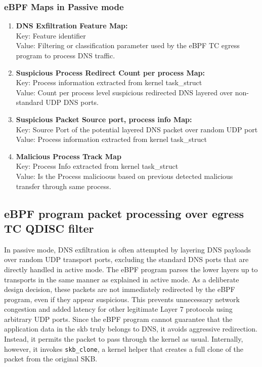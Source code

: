 \documentclass [11pt, proquest] {uwthesis}[2020/02/24]
\begin{document}
\subsubsection{\textbf{eBPF Maps in Passive mode}}
\begin{enumerate}[itemsep=1pt,parsep=0pt]
\label{passive:maps}
\item \textbf{DNS Exfiltration Feature Map:} \\
Key: Feature identifier \\
Value: Filtering or classification parameter used by the eBPF TC egress program to process DNS traffic.

\item \textbf{Suspicious Process Redirect Count per process Map:} \\
Key: Process information extracted from kernel task\_struct \\
Value: Count per process level suspicious redirected DNS layered over non-standard UDP DNS ports.

\item \textbf{Suspicious Packet Source port, process info Map:} \\
Key: Source Port of the potential layered DNS packet over random UDP port \\
Value: Process information extracted from kernel task\_struct 


\item \textbf{Malicious Process Track Map} \\
Key: Process Info extracted from kernel task\_struct \\
Value: Is the Process malicioous based on previous detected malicious transfer through same process.
\end{enumerate}





\subsection{\textbf{eBPF program packet processing over egress TC QDISC filter}}
\label{passive:sec1}
In passive mode, DNS exfiltration is often attempted by layering DNS payloads over random UDP transport ports, excluding the standard DNS ports that are directly handled in active mode. The eBPF program parses the lower layers up to transports in the same manner as explained in active mode. As a deliberate design decision, these packets are not immediately redirected by the eBPF program, even if they appear suspicious. This prevents unnecessary network congestion and added latency for other legitimate Layer 7 protocols using arbitrary UDP ports. Since the eBPF program cannot guarantee that the application data in the skb truly belongs to DNS, it avoids aggressive redirection. Instead, it permits the packet to pass through the kernel as usual. Internally, however, it invokes \texttt{skb\_clone}, a kernel helper that creates a full clone of the packet from the original SKB.
\end{document}
